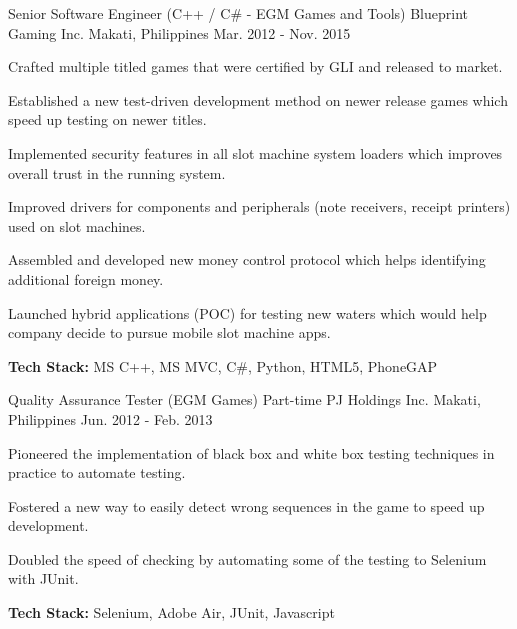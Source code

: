 \begin{cventries}
    \cventry
        {Senior Software Engineer (C++ / C\# - EGM Games and Tools)}
        {Blueprint Gaming Inc.}
        {Makati, Philippines}
        {Mar. 2012 - Nov. 2015}
        {
            \begin{cvitems}
                \item
                    {Crafted multiple titled games that were certified by GLI and released to market.}
                \item
                    {Established a new test-driven development method on newer release games which speed up testing on newer titles.}
                \item 
                    {Implemented security features in all slot machine system loaders which improves overall trust in the running system.}
                \item
                    {Improved drivers for components and peripherals (note receivers, receipt printers) used on slot machines.}
                \item 
                    {Assembled and developed new money control protocol which helps identifying additional foreign money.}
                \item 
                    {Launched hybrid applications (POC) for testing new waters which would help company decide to pursue mobile slot machine apps.}
                \item 
                    {\textbf{Tech Stack:} MS C++, MS MVC, C\#, Python, HTML5, PhoneGAP}
            \end{cvitems}
        }
        
    \cventry
        {Quality Assurance Tester (EGM Games) Part-time}
        {PJ Holdings Inc.}
        {Makati, Philippines}
        {Jun. 2012 - Feb. 2013}
        {
            \begin{cvitems}
                \item
                    {Pioneered the implementation of black box and white box testing techniques in practice to automate testing.}
                \item 
                    {Fostered a new way to easily detect wrong sequences in the game to speed up development.}
                \item
                    {Doubled the speed of checking by automating some of the testing to Selenium with JUnit.}
                \item 
                    {\textbf{Tech Stack:} Selenium, Adobe Air, JUnit, Javascript}
            \end{cvitems}        
        }
        

\end{cventries}
